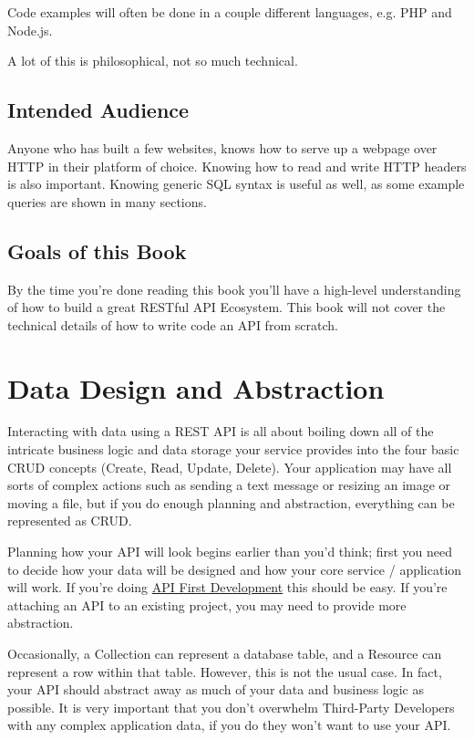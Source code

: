 \documentclass{book}
\begin{document}
Code examples will often be done in a couple different languages, e.g. PHP and Node.js.

A lot of this is philosophical, not so much technical.

\section{Intended Audience}

Anyone who has built a few websites, knows how to serve up a webpage over HTTP in their platform of choice. Knowing how to read and write HTTP headers is also important. Knowing generic SQL syntax is useful as well, as some example queries are shown in many sections.

\section{Goals of this Book}

By the time you're done reading this book you'll have a high-level understanding of how to build a great RESTful API Ecosystem. This book will not cover the technical details of how to write code an API from scratch.


\chapter{Data Design and Abstraction}

Interacting with data using a REST API is all about boiling down all of the intricate business logic and data storage your service provides into the four basic CRUD concepts (Create, Read, Update, Delete). Your application may have all sorts of complex actions such as sending a text message or resizing an image or moving a file, but if you do enough planning and abstraction, everything can be represented as CRUD.

Planning how your API will look begins earlier than you'd think; first you need to decide how your data will be designed and how your core service / application will work. If you're doing \href{http://blog.pop.co/post/67465239611/why-we-chose-api-first-development}{API First Development} this should be easy. If you're attaching an API to an existing project, you may need to provide more abstraction.

Occasionally, a Collection can represent a database table, and a Resource can represent a row within that table. However, this is not the usual case. In fact, your API should abstract away as much of your data and business logic as possible. It is very important that you don't overwhelm Third-Party Developers with any complex application data, if you do they won't want to use your API.
\end{document}
